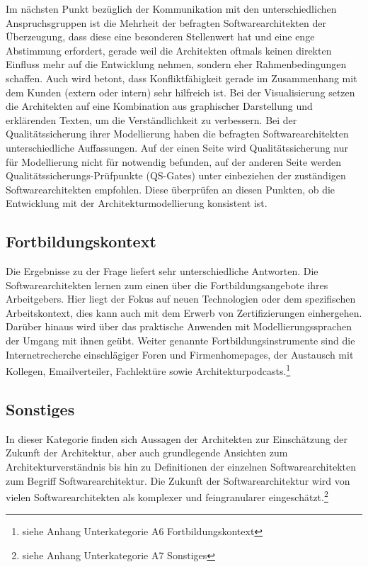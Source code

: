 Im nächsten Punkt bezüglich der Kommunikation mit den unterschiedlichen Anspruchsgruppen ist die Mehrheit der befragten Softwarearchitekten der Überzeugung, dass diese eine besonderen Stellenwert hat und eine enge Abstimmung erfordert, gerade weil die Architekten oftmals keinen direkten Einfluss mehr auf die Entwicklung nehmen, sondern eher Rahmenbedingungen schaffen. Auch wird betont, dass Konfliktfähigkeit gerade im Zusammenhang mit dem Kunden (extern oder intern) sehr hilfreich ist.
Bei der Visualisierung setzen die Architekten auf eine Kombination aus graphischer Darstellung und erklärenden Texten, um die Verständlichkeit zu verbessern.
Bei der Qualitätssicherung ihrer Modellierung haben die befragten Softwarearchitekten unterschiedliche Auffassungen. Auf der einen Seite wird Qualitätssicherung nur für Modellierung nicht für notwendig befunden, auf der anderen Seite werden Qualitätssicherungs-Prüfpunkte (QS-Gates) unter einbeziehen der zuständigen Softwarearchitekten empfohlen. Diese überprüfen an diesen Punkten, ob die Entwicklung mit der Architekturmodellierung konsistent ist.

\subsection{Fortbildungskontext}

Die Ergebnisse zu der Frage liefert sehr unterschiedliche Antworten. Die Softwarearchitekten lernen zum einen über die Fortbildungsangebote ihres Arbeitgebers. Hier liegt der Fokus auf neuen Technologien oder dem spezifischen Arbeitskontext, dies kann auch mit dem Erwerb von Zertifizierungen einhergehen. Darüber hinaus wird über das praktische Anwenden mit Modellierungssprachen der Umgang mit ihnen geübt. Weiter genannte Fortbildungsinstrumente sind die Internetrecherche einschlägiger Foren und Firmenhomepages, der Austausch mit Kollegen, Emailverteiler, Fachlektüre sowie Architekturpodcasts.\footnote{siehe Anhang Unterkategorie A6 Fortbildungskontext}

\subsection{Sonstiges}

In dieser Kategorie finden sich Aussagen der Architekten zur Einschätzung der Zukunft der Architektur, aber auch grundlegende Ansichten zum Architekturverständnis bis hin zu Definitionen der einzelnen Softwarearchitekten zum Begriff Softwarearchitektur. Die Zukunft der Softwarearchitektur wird von vielen Softwarearchitekten als komplexer und feingranularer eingeschätzt.\footnote{siehe Anhang Unterkategorie A7 Sonstiges} 

